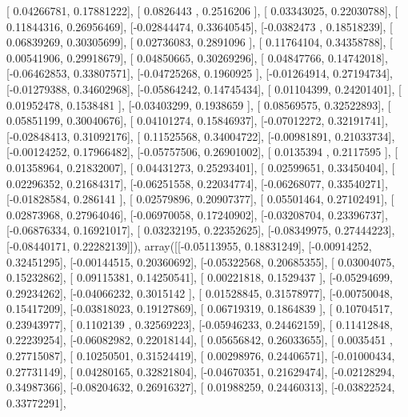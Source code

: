 \documentclass{article}
\begin{document}
       [ 0.04266781,  0.17881222],
       [ 0.0826443 ,  0.2516206 ],
       [ 0.03343025,  0.22030788],
       [ 0.11844316,  0.26956469],
       [-0.02844474,  0.33640545],
       [-0.0382473 ,  0.18518239],
       [ 0.06839269,  0.30305699],
       [ 0.02736083,  0.2891096 ],
       [ 0.11764104,  0.34358788],
       [ 0.00541906,  0.29918679],
       [ 0.04850665,  0.30269296],
       [ 0.04847766,  0.14742018],
       [-0.06462853,  0.33807571],
       [-0.04725268,  0.1960925 ],
       [-0.01264914,  0.27194734],
       [-0.01279388,  0.34602968],
       [-0.05864242,  0.14745434],
       [ 0.01104399,  0.24201401],
       [ 0.01952478,  0.1538481 ],
       [-0.03403299,  0.1938659 ],
       [ 0.08569575,  0.32522893],
       [ 0.05851199,  0.30040676],
       [ 0.04101274,  0.15846937],
       [-0.07012272,  0.32191741],
       [-0.02848413,  0.31092176],
       [ 0.11525568,  0.34004722],
       [-0.00981891,  0.21033734],
       [-0.00124252,  0.17966482],
       [-0.05757506,  0.26901002],
       [ 0.0135394 ,  0.2117595 ],
       [ 0.01358964,  0.21832007],
       [ 0.04431273,  0.25293401],
       [ 0.02599651,  0.33450404],
       [ 0.02296352,  0.21684317],
       [-0.06251558,  0.22034774],
       [-0.06268077,  0.33540271],
       [-0.01828584,  0.286141  ],
       [ 0.02579896,  0.20907377],
       [ 0.05501464,  0.27102491],
       [ 0.02873968,  0.27964046],
       [-0.06970058,  0.17240902],
       [-0.03208704,  0.23396737],
       [-0.06876334,  0.16921017],
       [ 0.03232195,  0.22352625],
       [-0.08349975,  0.27444223],
       [-0.08440171,  0.22282139]]), array([[-0.05113955,  0.18831249],
       [-0.00914252,  0.32451295],
       [-0.00144515,  0.20360692],
       [-0.05322568,  0.20685355],
       [ 0.03004075,  0.15232862],
       [ 0.09115381,  0.14250541],
       [ 0.00221818,  0.1529437 ],
       [-0.05294699,  0.29234262],
       [-0.04066232,  0.3015142 ],
       [ 0.01528845,  0.31578977],
       [-0.00750048,  0.15417209],
       [-0.03818023,  0.19127869],
       [ 0.06719319,  0.1864839 ],
       [ 0.10704517,  0.23943977],
       [ 0.1102139 ,  0.32569223],
       [-0.05946233,  0.24462159],
       [ 0.11412848,  0.22239254],
       [-0.06082982,  0.22018144],
       [ 0.05656842,  0.26033655],
       [ 0.0035451 ,  0.27715087],
       [ 0.10250501,  0.31524419],
       [ 0.00298976,  0.24406571],
       [-0.01000434,  0.27731149],
       [ 0.04280165,  0.32821804],
       [-0.04670351,  0.21629474],
       [-0.02128294,  0.34987366],
       [-0.08204632,  0.26916327],
       [ 0.01988259,  0.24460313],
       [-0.03822524,  0.33772291],
\end{document}

